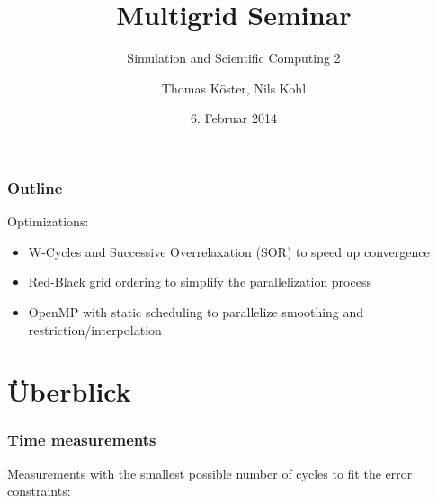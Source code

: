 \documentclass[handout]{beamer}
\title{Multigrid Seminar}
\subtitle{Simulation and Scientific Computing 2}
\author{Thomas Köster, Nils Kohl}
\date{6. Februar 2014}
\begin{document}
    
    \begin{frame}
        \frametitle{Outline}
		Optimizations:
		\begin{itemize}
			\item W-Cycles and Successive Overrelaxation (SOR) to speed up convergence
			\pause
			\item Red-Black grid ordering to simplify the parallelization process
			\pause
			\item OpenMP with static scheduling to parallelize smoothing and restriction/interpolation
		\end{itemize}
    \end{frame}    

    \section{Überblick}    	
    \begin{frame}
        \frametitle{Time measurements}
		Measurements with the smallest possible number of cycles to fit the error constraints:
		\center
    \end{frame}
\end{document}
